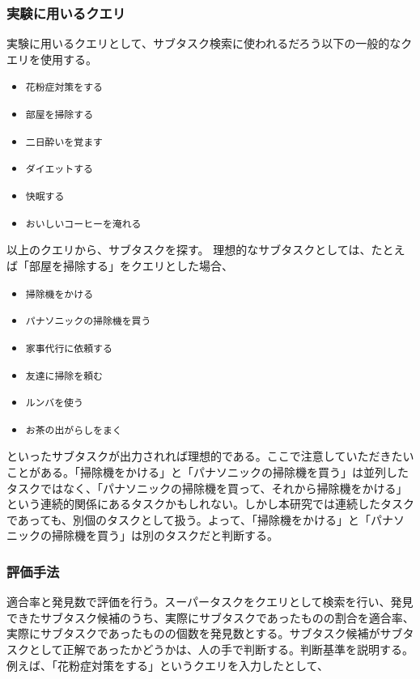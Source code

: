 \documentclass[submit,techreq]{ipsj}
\def\|{\verb|}
\begin{document}
%5.1.3
\subsubsection{実験に用いるクエリ}

実験に用いるクエリとして、サブタスク検索に使われるだろう以下の一般的なクエリを使用する。

\begin{itemize}
\item \|花粉症対策をする|
\item \|部屋を掃除する|
\item \|二日酔いを覚ます|
\item \|ダイエットする|
\item \|快眠する|
\item \|おいしいコーヒーを淹れる|
\end{itemize}


以上のクエリから、サブタスクを探す。
理想的なサブタスクとしては、たとえば「部屋を掃除する」をクエリとした場合、

\begin{itemize}
\item \|掃除機をかける|
\item \|パナソニックの掃除機を買う|
\item \|家事代行に依頼する|
\item \|友達に掃除を頼む|
\item \|ルンバを使う|
\item \|お茶の出がらしをまく|
\end{itemize}

といったサブタスクが出力されれば理想的である。ここで注意していただきたいことがある。「掃除機をかける」と「パナソニックの掃除機を買う」は並列したタスクではなく、「パナソニックの掃除機を買って、それから掃除機をかける」という連続的関係にあるタスクかもしれない。しかし本研究では連続したタスクであっても、別個のタスクとして扱う。よって、「掃除機をかける」と「パナソニックの掃除機を買う」は別のタスクだと判断する。


\subsubsection{評価手法}
適合率と発見数で評価を行う。スーパータスクをクエリとして検索を行い、発見できたサブタスク候補のうち、実際にサブタスクであったものの割合を適合率、実際にサブタスクであったものの個数を発見数とする。サブタスク候補がサブタスクとして正解であったかどうかは、人の手で判断する。判断基準を説明する。例えば、「花粉症対策をする」というクエリを入力したとして、
\end{document}
